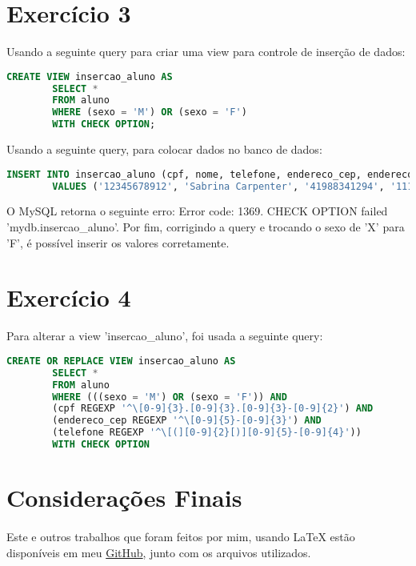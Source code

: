 \documentclass{article}
\begin{document}
\section*{Exercício 3}
Usando a seguinte query para criar uma view para controle de inserção de dados:

    \begin{lstlisting}[language=SQL]
        CREATE VIEW insercao_aluno AS
        SELECT *
        FROM aluno
        WHERE (sexo = 'M') OR (sexo = 'F')
        WITH CHECK OPTION;
    \end{lstlisting}

Usando a seguinte query, para colocar dados no banco de dados:

    \begin{lstlisting}[language=SQL]
        INSERT INTO insercao_aluno (cpf, nome, telefone, endereco_cep, endereco_num, sexo)
        VALUES ('12345678912', 'Sabrina Carpenter', '41988341294', '11111111', 42, 'X')
    \end{lstlisting}

O MySQL retorna o seguinte erro: Error code: 1369. CHECK OPTION failed 'mydb.insercao\_aluno'. Por fim, corrigindo a query e trocando o sexo de 'X' para 'F', é possível inserir os valores corretamente.

\section*{Exercício 4}
Para alterar a view 'insercao\_aluno', foi usada a seguinte query:

    \begin{lstlisting}[language=SQL]
        CREATE OR REPLACE VIEW insercao_aluno AS
        SELECT *
        FROM aluno
        WHERE (((sexo = 'M') OR (sexo = 'F')) AND 
        (cpf REGEXP '^\[0-9]{3}.[0-9]{3}.[0-9]{3}-[0-9]{2}') AND 
        (endereco_cep REGEXP '^\[0-9]{5}-[0-9]{3}') AND
        (telefone REGEXP '^\[(][0-9]{2}[)][0-9]{5}-[0-9]{4}'))
        WITH CHECK OPTION
    \end{lstlisting}

\section*{Considerações Finais}
\paragraph{}Este e outros trabalhos que foram feitos por mim, usando \LaTeX{} estão disponíveis em meu \href{https://github.com/gpgp2006/LaTeX}{GitHub}, junto com os arquivos utilizados.
\end{document}
